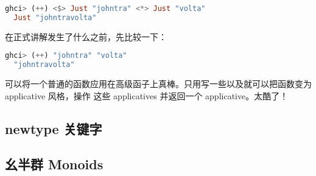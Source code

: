 \documentclass[./main.tex]{subfiles}
\begin{document}
\begin{lstlisting}[language=Haskell]
  ghci> (++) <$> Just "johntra" <*> Just "volta"
  Just "johntravolta"
\end{lstlisting}

在正式讲解发生了什么之前，先比较一下：

\begin{lstlisting}[language=Haskell]
  ghci> (++) "johntra" "volta"
  "johntravolta"
\end{lstlisting}

可以将一个普通的函数应用在高级函子上真棒。只用写一些\acode{<\$>}以及\acode{<*>}就可以把函数变为 applicative 风格，操作
这些 applicatives 并返回一个 applicative。太酷了！






\subsection*{newtype 关键字}


\subsection*{幺半群 Monoids}

\end{document}
